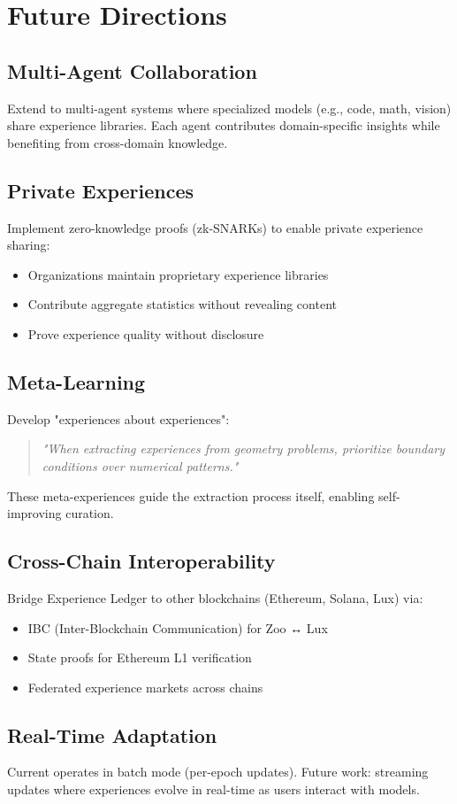 \section{Future Directions}


\subsection{Multi-Agent Collaboration}

Extend \DSO{} to multi-agent systems where specialized models (e.g., code, math, vision) share experience libraries. Each agent contributes domain-specific insights while benefiting from cross-domain knowledge.

\subsection{Private Experiences}

Implement zero-knowledge proofs (zk-SNARKs) to enable private experience sharing:
\begin{itemize}
    \item Organizations maintain proprietary experience libraries
    \item Contribute aggregate statistics without revealing content
    \item Prove experience quality without disclosure
\end{itemize}

\subsection{Meta-Learning}

Develop "experiences about experiences":
\begin{quote}
\textit{"When extracting experiences from geometry problems, prioritize boundary conditions over numerical patterns."}
\end{quote}

These meta-experiences guide the extraction process itself, enabling self-improving curation.

\subsection{Cross-Chain Interoperability}

Bridge Experience Ledger to other blockchains (Ethereum, Solana, Lux) via:
\begin{itemize}
    \item IBC (Inter-Blockchain Communication) for Zoo ↔ Lux
    \item State proofs for Ethereum L1 verification
    \item Federated experience markets across chains
\end{itemize}

\subsection{Real-Time Adaptation}

Current \DSO{} operates in batch mode (per-epoch updates). Future work: streaming updates where experiences evolve in real-time as users interact with models.

